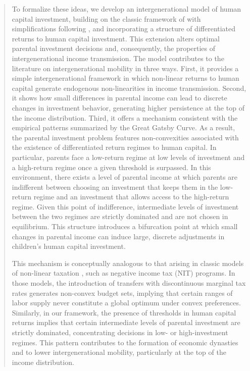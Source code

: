 \documentclass[12pt]{article}
\begin{document}
\begin{abstract}
To formalize these ideas, we develop an intergenerational model of human capital investment, building on the classic framework of \textcite{Becker_Tomes_1979} with simplifications following \textcite{Solon_1999}, and incorporating a structure of differentiated returns to human capital investment. This extension alters optimal parental investment decisions and, consequently, the properties of intergenerational income transmission. The model contributes to the literature on intergenerational mobility in three ways. First, it provides a simple intergenerational framework in which non-linear returns to human capital generate endogenous non-linearities in income transmission. Second, it shows how small differences in parental income can lead to discrete changes in investment behavior, generating higher persistence at the top of the income distribution. Third, it offers a mechanism consistent with the empirical patterns summarized by the Great Gatsby Curve.
As a result, the parental investment problem features non-convexities associated with the existence of differentiated return regimes to human capital. In particular, parents face a low-return regime at low levels of investment and a high-return regime once a given threshold is surpassed. In this environment, there exists a level of parental income at which parents are indifferent between choosing an investment that keeps them in the low-return regime and an investment that allows access to the high-return regime. Given this point of indifference, intermediate levels of investment between the two regimes are strictly dominated and are not chosen in equilibrium. This structure introduces a bifurcation point at which small changes in parental income can induce large, discrete adjustments in children’s human capital investment.

This mechanism is conceptually analogous to that arising in classic models of non-linear taxation \parencite{Burtless_1978,Hausman_1985}, such as negative income tax (NIT) programs. In those models, the introduction of transfers with discontinuous marginal tax rates generates non-convex budget sets, implying that certain ranges of labor supply never constitute a global optimum under convex preferences. Similarly, in our framework, the presence of thresholds in human capital returns implies that certain intermediate levels of parental investment are strictly dominated, concentrating decisions in low- or high-investment regimes. This pattern contributes to the formation of economic dynasties and to lower intergenerational mobility, particularly at the top of the income distribution.


\end{abstract}
\end{document}
